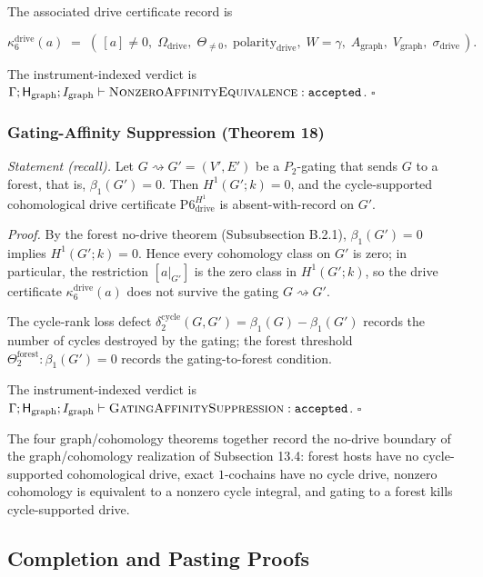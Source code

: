 \documentclass[11pt]{article}
\theoremstyle{definition}
\begin{document}
The associated drive certificate record is

\[
\kappa_{6}^{\mathrm{drive}}(a)\;=\;(\,[a]\neq 0,\;\Omega_{\mathrm{drive}},\;\Theta_{\neq0},\;\mathrm{polarity}_{\mathrm{drive}},\;W=\gamma,\;A_{\mathrm{graph}},\;V_{\mathrm{graph}},\;\sigma_{\mathrm{drive}}\,).
\]

The instrument-indexed verdict is \(\Gamma;\mathsf H_{\mathrm{graph}};I_{\mathrm{graph}}\vdash\textsc{NonzeroAffinityEquivalence}:\texttt{accepted}\). \(\square\)

\subsubsection{Gating-Affinity Suppression (Theorem 18)}

\emph{Statement (recall).} Let \(G\rightsquigarrow G'=(V',E')\) be a \(P_{2}\)-gating that sends \(G\) to a forest, that is, \(\beta_{1}(G')=0\). Then \(H^{1}(G';k)=0\), and the cycle-supported cohomological drive certificate \(\mathrm{P6}_{\mathrm{drive}}^{H^1}\) is absent-with-record on \(G'\).

\emph{Proof.} By the forest no-drive theorem (Subsubsection B.2.1), \(\beta_{1}(G')=0\) implies \(H^{1}(G';k)=0\). Hence every cohomology class on \(G'\) is zero; in particular, the restriction \([a|_{G'}]\) is the zero class in \(H^{1}(G';k)\), so the drive certificate \(\kappa_{6}^{\mathrm{drive}}(a)\) does not survive the gating \(G\rightsquigarrow G'\).

The cycle-rank loss defect \(\delta_{2}^{\mathrm{cycle}}(G,G')=\beta_{1}(G)-\beta_{1}(G')\) records the number of cycles destroyed by the gating; the forest threshold \(\Theta_{2}^{\mathrm{forest}}:\beta_{1}(G')=0\) records the gating-to-forest condition.

The instrument-indexed verdict is \(\Gamma;\mathsf H_{\mathrm{graph}};I_{\mathrm{graph}}\vdash\textsc{GatingAffinitySuppression}:\texttt{accepted}\). \(\square\)

The four graph/cohomology theorems together record the no-drive boundary of the graph/cohomology realization of Subsection 13.4: forest hosts have no cycle-supported cohomological drive, exact \(1\)-cochains have no cycle drive, nonzero cohomology is equivalent to a nonzero cycle integral, and gating to a forest kills cycle-supported drive.

\subsection{Completion and Pasting Proofs}
\end{document}
